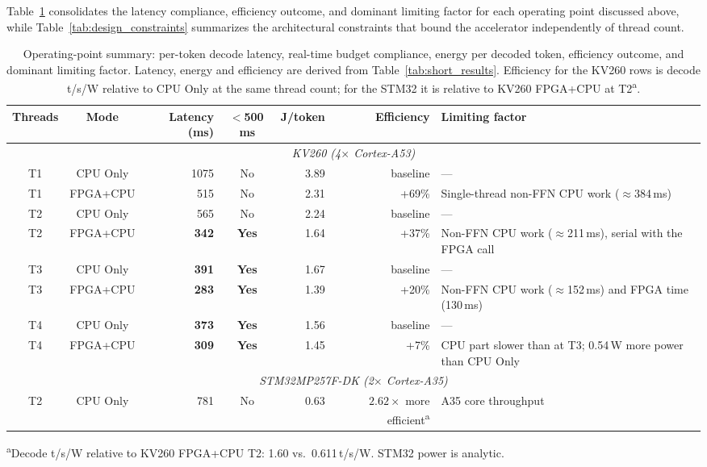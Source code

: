 Table~\ref{tab:operating_points} consolidates the latency compliance, efficiency
outcome, and dominant limiting factor for each operating point discussed above, while
Table~\ref{tab:design_constraints} summarizes the architectural constraints that bound
the accelerator independently of thread count.

\begin{table}[H]
\centering
\scriptsize
\caption{Operating-point summary: per-token decode latency, real-time budget
compliance, energy per decoded token, efficiency outcome, and dominant limiting factor.
Latency, energy and efficiency are derived from Table~\ref{tab:short_results}.
Efficiency for the KV260 rows is decode t/s/W relative to CPU Only at the same thread
count; for the STM32 it is relative to KV260 FPGA+CPU at
T2\protect\textsuperscript{a}.}
\label{tab:operating_points}
\setlength{\tabcolsep}{3pt}
\begin{tabular}{c c r c r r p{3.4cm}}
\hline
Threads & Mode & Latency (ms) & $<$500\,ms & J/token & Efficiency & Limiting factor \\
\hline
\multicolumn{7}{c}{\itshape KV260 (4$\times$ Cortex-A53)} \\
\hline
T1 & CPU Only  & 1075 & No           & 3.89 & baseline  & --- \\
T1 & FPGA+CPU  & 515  & No           & 2.31 & +69\%     & Single-thread non-FFN CPU work ($\approx$384\,ms) \\
T2 & CPU Only  & 565  & No           & 2.24 & baseline  & --- \\
T2 & FPGA+CPU  & \textbf{342}  & \textbf{Yes} & 1.64 & +37\%  & Non-FFN CPU work ($\approx$211\,ms), serial with the FPGA call \\
T3 & CPU Only  & \textbf{391}  & \textbf{Yes} & 1.67 & baseline  & --- \\
T3 & FPGA+CPU  & \textbf{283}  & \textbf{Yes} & 1.39 & +20\%     & Non-FFN CPU work ($\approx$152\,ms) and FPGA time (130\,ms) \\
T4 & CPU Only  & \textbf{373}  & \textbf{Yes} & 1.56 & baseline  & --- \\
T4 & FPGA+CPU  & \textbf{309}  & \textbf{Yes} & 1.45 & +7\%      & CPU part slower than at T3; 0.54\,W more power than CPU Only \\
\hline
\multicolumn{7}{c}{\itshape STM32MP257F-DK (2$\times$ Cortex-A35)} \\
\hline
T2 & CPU Only  & 781  & No           & 0.63 & $2.62{\times}$ more efficient\textsuperscript{a} & A35 core throughput \\
\hline
\end{tabular}
\par\vspace{4pt}
{\footnotesize\textsuperscript{a}Decode t/s/W relative to KV260 FPGA+CPU T2: 1.60 vs.\ 0.611\,t/s/W. STM32 power is analytic.}
\end{table}

